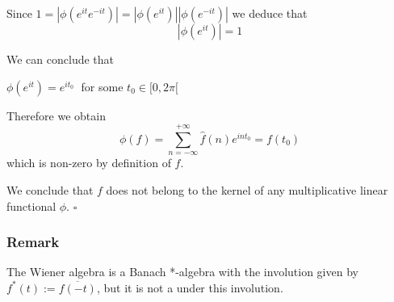 \documentclass[12pt]{article}
\begin{document}
Since $1=|\phi(e^{it}e^{-it})|=|\phi(e^{it})||\phi(e^{-it})|$ we deduce that
\begin{displaymath}
|\phi (e^{it})|=1
\end{displaymath}

We can conclude that
\begin{center}
$\phi(e^{it})=e^{it_0}\;$ for some $t_0 \in [0,2\pi[$
\end{center}

Therefore we obtain
\begin{displaymath}
\phi (f)= \sum_{n=-\infty}^{+\infty} \hat{f}(n)e^{int_0} = f(t_0)
\end{displaymath}
which is non-zero by definition of $f$.

We conclude that $f$ does not belong to the kernel of any multiplicative linear functional $\phi$. $\square$

\subsubsection{Remark}
The Wiener algebra is a Banach *-algebra with the involution given by $f^*(t):=\overline{f(-t)}$, but it is not a  under this involution.
\end{document}
